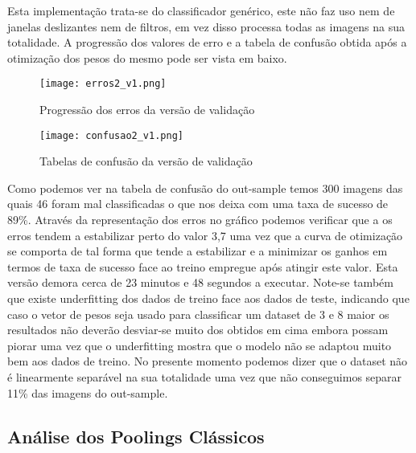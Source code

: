 Esta implementação trata-se do classificador genérico, este não faz uso nem de janelas deslizantes nem de filtros, em vez disso processa todas as imagens na sua totalidade. A progressão dos valores de erro e a tabela de confusão obtida após a otimização dos pesos do mesmo pode ser vista em baixo.

\begin{figure}[H]

  \centering
  \captionsetup{justification=centering}

  \texttt{[image: erros2\_v1.png]}
  
  \caption {Progressão dos erros da versão de validação}
\end{figure}

\begin{figure}[H]

  \centering
  \captionsetup{justification=centering}

  \texttt{[image: confusao2\_v1.png]}
  
  \caption {Tabelas de confusão da versão de validação}
\end{figure}


Como podemos ver na tabela de confusão do out-sample temos 300 imagens das quais 46 foram mal classificadas o que nos deixa com uma taxa de sucesso de 89\%. Através da representação dos erros no gráfico podemos verificar que a os erros tendem a estabilizar perto do valor 3,7 uma vez que a curva de otimização se comporta de tal forma que tende a estabilizar e a minimizar os ganhos em termos de taxa de sucesso face ao treino empregue após atingir este valor. Esta versão demora cerca de 23 minutos e 48 segundos a executar.\hfill\newline
Note-se também que existe underfitting dos dados de treino face aos dados de teste, indicando que caso o vetor de pesos seja usado para classificar um dataset de 3 e 8 maior os resultados não deverão desviar-se muito dos obtidos em cima embora possam piorar uma vez que o underfitting mostra que o modelo não se adaptou muito bem aos dados de treino.\newline
No presente momento podemos dizer que o dataset não é linearmente separável na sua totalidade uma vez que não conseguimos separar 11\% das imagens do out-sample.
 



\subsection{Análise dos Poolings Clássicos}

